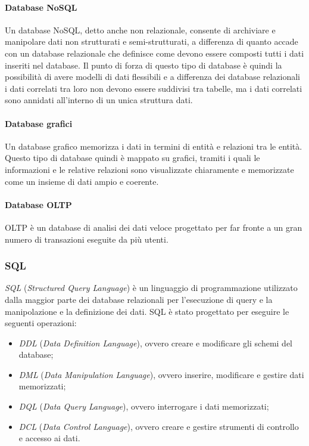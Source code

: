   \paragraph{Database NoSQL}
  Un database NoSQL, detto anche non relazionale, consente di archiviare e manipolare dati non strutturati e 
  semi-strutturati, a differenza di quanto accade con un database relazionale che definisce come devono essere 
  composti tutti i dati inseriti nel database. Il punto di forza di questo tipo di database è quindi la possibilità
  di avere modelli di dati flessibili e a differenza dei database relazionali i dati correlati tra loro non devono essere
  suddivisi tra tabelle, ma i dati correlati sono annidati all'interno di un unica struttura dati.
  \paragraph{Database grafici}
  Un database grafico memorizza i dati in termini di entità e relazioni tra le entità. Questo tipo di database quindi 
  è mappato su grafici, tramiti i quali le informazioni e le relative relazioni sono visualizzate chiaramente e memorizzate
  come un insieme di dati ampio e coerente.
  \paragraph{Database OLTP}
  OLTP è un database di analisi dei dati veloce progettato per far fronte a un gran numero di transazioni
  eseguite da più utenti.

  \subsubsection{SQL}
  \textit{SQL} (\textit{Structured Query Language}) è un linguaggio di programmazione utilizzato dalla maggior parte
  dei database relazionali per l'esecuzione di query e la manipolazione e la definizione dei dati.
  SQL è stato progettato per eseguire le seguenti operazioni:
  \begin{itemize}
    \item \textit{DDL} (\textit{Data Definition Language}), ovvero creare e modificare gli schemi del database;
    \item \textit{DML} (\textit{Data Manipulation Language}), ovvero inserire, modificare e gestire dati memorizzati;
    \item \textit{DQL} (\textit{Data Query Language}), ovvero interrogare i dati memorizzati;
    \item \textit{DCL} (\textit{Data Control Language}), ovvero creare e gestire strumenti di controllo e accesso ai dati.
  \end{itemize}
